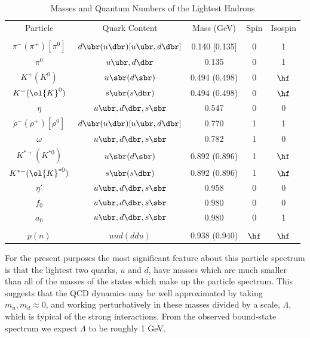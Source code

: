 \documentclass[12pt]{report}
\begin{document}
\begin{table}
\begin{center}
\begin{tabular}{ccccc}
Particle & Quark Content & Mass (GeV) 
& Spin & Isospin \\ &&&& \\
$\pi^- (\pi^+) [\pi^0]$ & $d \ubr (u \dbr) 
[u\ubr,d\dbr]$ & 0.140 [0.135]& 0 & 1 \\
$\pi^0$ & $u\ubr, d \dbr$ & 0.135 & 0 & 1 \\ 
$K^+ (K^0)$ & $u \sbr (d \sbr)$ &
0.494 (0.498) & 0 & $\hf$ \\
$K^- (\ol{K}^0)$ & $s \ubr (s \dbr)$ & 
0.494 (0.498) & 0 & $\hf$ \\
$\eta$ & $u \ubr, d \dbr, s\sbr$ & 0.547 & 0 & 0 \\ 
$\rho^- (\rho^+) [\rho^0]$
& $d \ubr (u \dbr) [u\ubr, d\dbr]$ & 0.770 & 1 &
1 \\
$\omega$ & $u \ubr, d \dbr, s\sbr$ & 0.782 & 1 & 0 \\  
$K^{*+} (K^{*0})$ & $u
\sbr (d \sbr)$ & 0.892 (0.896) & 1 & $\hf$ \\
$K^{*-} (\ol{K}^{*0})$ & $s \ubr (s \dbr)$ 
& 0.892 (0.896) & 1 & $\hf$ \\
$\eta'$ & $u \ubr, d \dbr, s\sbr$ & 0.958 & 0 & 0 \\  
$f_0$ & $u \ubr, d \dbr,
s\sbr$ & 0.980 & 0 & 0 \\  $a_0$ & $u \ubr, 
d \dbr, s\sbr$ & 0.980 & 0 & 1 \\
&&&& \\
$p (n)$ & $uud (ddu)$ & 0.938 (0.940) & $\hf$ & $\hf$ \\ 
\end{tabular}
\caption{Masses and Quantum Numbers of the Lightest
Hadrons} \end{center}
\end{table}

For the present purposes the most significant feature about
this particle spectrum is that the lightest two quarks, $u$
and $d$, have masses which are much smaller than all of the
masses of the states which make up the particle spectrum.
This suggests that the QCD dynamics may be well
approximated by taking $m_u , 
m_d \approx 0$, and working perturbatively in these masses
divided by a scale, $\Lambda$, which is typical of the
strong interactions. {}From the observed bound-state
spectrum we expect $\Lambda$ to be roughly 1 GeV.
\end{document}
